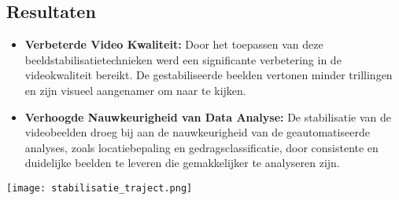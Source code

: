 \subsection{Resultaten}
\begin{itemize}
  \item \textbf{Verbeterde Video Kwaliteit:} Door het toepassen van deze beeldstabilisatietechnieken werd een significante verbetering in de videokwaliteit bereikt. De gestabiliseerde beelden vertonen minder trillingen en zijn visueel aangenamer om naar te kijken.
  \item \textbf{Verhoogde Nauwkeurigheid van Data Analyse:} De stabilisatie van de videobeelden droeg bij aan de nauwkeurigheid van de geautomatiseerde analyses, zoals locatiebepaling en gedragsclassificatie, door consistente en duidelijke beelden te leveren die gemakkelijker te analyseren zijn.
\end{itemize}
\newline 
\texttt{[image: stabilisatie\_traject.png]}
\newline